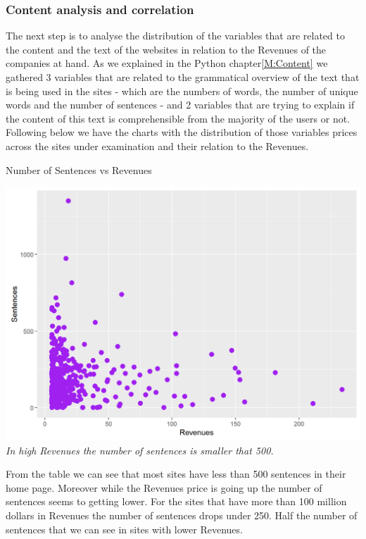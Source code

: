 \documentclass{book}
\begin{document}
\subsubsection{Content analysis and correlation}
The next step is to analyse the distribution of the variables that are related to the content and the text of the websites in relation to the Revenues of the companies at hand. As we explained in the Python chapter\ref{M:Content} we gathered 3 variables that are related to the grammatical overview of the text that is being used in the sites - which are the numbers of words, the number of unique words and the number of sentences - and 2 variables that are trying to explain if the content of this text is comprehensible from the majority of the users or not. Following below we have the charts with the distribution of those variables prices across the sites under examination and their relation to the Revenues.
\begin{table}[H]
\centering
\caption{Number of Sentences vs Revenues}
\begin{center}
\includegraphics[scale=0.4]{../R/photos/33_sent_rev.png}  \\
\textit{In high Revenues the number of sentences is smaller that 500.}
\end{center}
\end{table}
From the table we can see that most sites have less than 500 sentences in their home page. Moreover while the Revenues price is going up the number of sentences seems to getting lower. For the sites that have more than 100 million dollars in Revenues the number of sentences drops under 250. Half the number of sentences that we can see in sites with lower Revenues.
\end{document}

